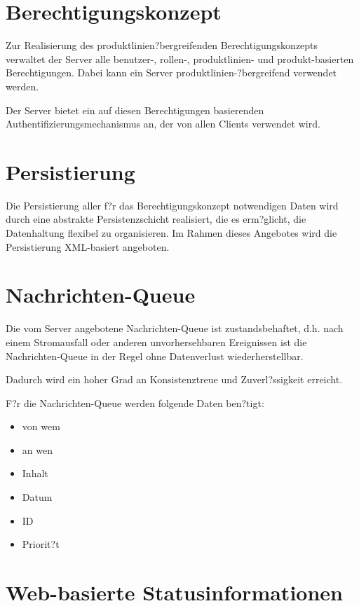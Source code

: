 \section{Berechtigungskonzept}

Zur Realisierung des produktlinien\-?bergreifenden Berechtigungskonzepts
verwaltet der Server alle benutzer-, rollen-, produktlinien- und
produkt-basierten Berechtigungen. Dabei kann ein Server produktlinien-?bergreifend
verwendet werden.\par
Der Server bietet ein auf diesen Berechtigungen basierenden
Authentifizierungsmechanismus an, der von allen Clients verwendet wird.

\section{Persistierung}

Die Persistierung aller f?r das Berechtigungskonzept notwendigen Daten wird
durch eine abstrakte Persistenzschicht realisiert, die es erm?glicht, die
Datenhaltung flexibel zu organisieren. Im Rahmen dieses Angebotes wird die
Persistierung XML-basiert angeboten.

\section{Nachrichten-Queue}

Die vom Server angebotene Nachrichten-Queue ist zustandsbehaftet, d.h. nach einem
Stromausfall oder anderen unvorhersehbaren Ereignissen ist die Nachrichten-Queue
in der Regel ohne Datenverlust wiederherstellbar.\par
Dadurch wird ein hoher Grad an Konsistenztreue und Zuverl?ssigkeit erreicht.\newline

F?r die Nachrichten-Queue werden folgende Daten ben?tigt:
\begin{itemize}
\item von wem
\item an wen
\item Inhalt
\item Datum
\item ID
\item Priorit?t
\end{itemize}



\section{Web-basierte Statusinformationen}


